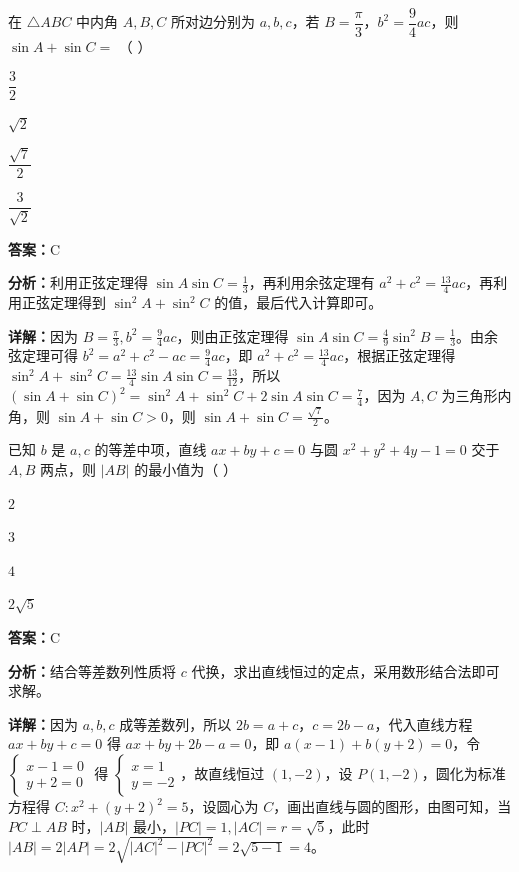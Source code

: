 \begin{question}[points=5]
在 $\triangle ABC$ 中内角 $A,B,C$ 所对边分别为 $a,b,c$，若 $B=\dfrac{\pi}{3}$，$b^2=\dfrac{9}{4}ac$，则 $\sin A+\sin C=$ （   ）
\begin{choices}
  \item $\dfrac{3}{2}$
  \item $\sqrt{2}$
  \item $\dfrac{\sqrt{7}}{2}$
  \item $\dfrac{3}{\sqrt{2}}$
\end{choices}
\begin{solution}
\textbf{答案：}C

\textbf{分析：}利用正弦定理得 $\sin A\sin C=\frac{1}{3}$，再利用余弦定理有 $a^2+c^2=\frac{13}{4}ac$，再利用正弦定理得到 $\sin^2 A+\sin^2 C$ 的值，最后代入计算即可。

\textbf{详解：}因为 $B=\frac{\pi}{3},b^2=\frac{9}{4}ac$，则由正弦定理得 $\sin A\sin C=\frac{4}{9}\sin^2 B=\frac{1}{3}$。由余弦定理可得 $b^2=a^2+c^2-ac=\frac{9}{4}ac$，即 $a^2+c^2=\frac{13}{4}ac$，根据正弦定理得 $\sin^2 A+\sin^2 C=\frac{13}{4}\sin A\sin C=\frac{13}{12}$，所以 $(\sin A+\sin C)^2=\sin^2 A+\sin^2 C+2\sin A\sin C=\frac{7}{4}$，因为 $A,C$ 为三角形内角，则 $\sin A+\sin C>0$，则 $\sin A+\sin C=\frac{\sqrt{7}}{2}$。
\end{solution}
\end{question}

\begin{question}[points=5]
已知 $b$ 是 $a,c$ 的等差中项，直线 $ax+by+c=0$ 与圆 $x^2+y^2+4y-1=0$ 交于 $A,B$ 两点，则 $|AB|$ 的最小值为（   ）
\begin{choices}
  \item $2$
  \item $3$
  \item $4$
  \item $2\sqrt{5}$
\end{choices}
\begin{solution}
\textbf{答案：}C

\textbf{分析：}结合等差数列性质将 $c$ 代换，求出直线恒过的定点，采用数形结合法即可求解。

\textbf{详解：}因为 $a,b,c$ 成等差数列，所以 $2b=a+c$，$c=2b-a$，代入直线方程 $ax+by+c=0$ 得 $ax+by+2b-a=0$，即 $a(x-1)+b(y+2)=0$，令 $\begin{cases}x-1=0\\y+2=0\end{cases}$ 得 $\begin{cases}x=1\\y=-2\end{cases}$，故直线恒过 $(1,-2)$，设 $P(1,-2)$，圆化为标准方程得 $C:x^2+(y+2)^2=5$，设圆心为 $C$，画出直线与圆的图形，由图可知，当 $PC\perp AB$ 时，$|AB|$ 最小，$|PC|=1,|AC|=r=\sqrt{5}$，此时 $|AB|=2|AP|=2\sqrt{|AC|^2-|PC|^2}=2\sqrt{5-1}=4$。
\end{solution}
\end{question}

